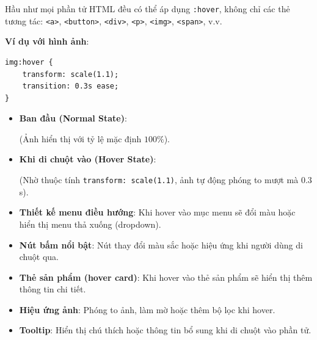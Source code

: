 \documentclass[11pt,oneside]{book}
\newcommand{\codeinline}[1]{\textcolor{accentOrange}{\texttt{#1}}}
\begin{document}
\begin{conceptBox}
Hầu như mọi phần tử HTML đều có thể áp dụng \codeinline{:hover}, không chỉ các thẻ tương tác: \codeinline{<a>}, \codeinline{<button>}, \codeinline{<div>}, \codeinline{<p>}, \codeinline{<img>}, \codeinline{<span>}, v.v.

\textbf{Ví dụ với hình ảnh}:
\begin{codeWindow}
\begin{lstlisting}[language=CSS3]
img:hover {
    transform: scale(1.1);
    transition: 0.3s ease;
}
\end{lstlisting}
\end{codeWindow}

\begin{browserWindow}
\sffamily\small
\begin{itemize}[leftmargin=1.5em, itemsep=3pt, parsep=0pt]
    \item \textbf{Ban đầu (Normal State)}:
    \par\vspace{2pt}
    \quad (Ảnh hiển thị với tỷ lệ mặc định $100\%$).
    \par\vspace{4pt}
    \item \textbf{Khi di chuột vào (Hover State)}:
    \par\vspace{2pt}
    \quad (Nhờ thuộc tính \codeinline{transform: scale(1.1)}, ảnh tự động phóng to mượt mà $0.3$s).
\end{itemize}
\end{browserWindow}
\end{conceptBox}

\begin{tipBox}
\begin{itemize}[leftmargin=1.5em, itemsep=2pt, parsep=0pt]
    \item \textbf{Thiết kế menu điều hướng}: Khi hover vào mục menu sẽ đổi màu hoặc hiển thị menu thả xuống (dropdown).
    \item \textbf{Nút bấm nổi bật}: Nút thay đổi màu sắc hoặc hiệu ứng khi người dùng di chuột qua.
    \item \textbf{Thẻ sản phẩm (hover card)}: Khi hover vào thẻ sản phẩm sẽ hiển thị thêm thông tin chi tiết.
    \item \textbf{Hiệu ứng ảnh}: Phóng to ảnh, làm mờ hoặc thêm bộ lọc khi hover.
    \item \textbf{Tooltip}: Hiển thị chú thích hoặc thông tin bổ sung khi di chuột vào phần tử.
\end{itemize}
\end{tipBox}
\end{document}

